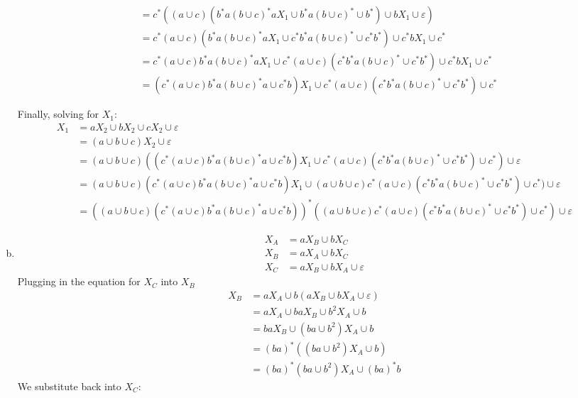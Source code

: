 \begin{solution}
\begin{enumerate}[(a)]
\begin{align*}
            &= c^*((a\cup c)(b^*a{(b\cup c)}^*aX_1\cup b^*a{(b\cup c)}^*\cup b^*)\cup bX_1\cup\varepsilon)\\
            &= c^*(a\cup c)(b^*a{(b\cup c)}^*aX_1\cup c^*b^*a{(b\cup c)}^*\cup c^*b^*)\cup c^*bX_1\cup c^*\\
            &= c^*(a\cup c)b^*a{(b\cup c)}^*aX_1\cup c^*(a\cup c)(c^*b^*a{(b\cup c)}^*\cup c^*b^*)\cup c^*bX_1\cup c^*\\
            &= (c^*(a\cup c)b^*a{(b\cup c)}^*a\cup c^*b)X_1\cup c^*(a\cup c)(c^*b^*a{(b\cup c)}^*\cup c^*b^*)\cup c^*
    \end{align*}

    Finally, solving for \(X_1\):
    \begin{align*}
        X_1 &= aX_2\cup bX_2\cup cX_2\cup\varepsilon \\
            &= (a\cup b\cup c)X_2\cup\varepsilon \\
            &= (a\cup b\cup c)((c^*(a\cup c)b^*a{(b\cup c)}^*a\cup c^*b)X_1\cup c^*(a\cup c)(c^*b^*a{(b\cup c)}^*\cup c^*b^*)\cup c^*)\cup\varepsilon \\
            &= (a\cup b\cup c)(c^*(a\cup c)b^*a{(b\cup c)}^*a\cup c^*b)X_1\cup (a\cup b\cup c)c^*(a\cup c)(c^*b^*a{(b\cup c)}^*\cup c^*b^*)\cup c^*)\cup\varepsilon \\
            &= {\left((a\cup b\cup c)(c^*(a\cup c)b^*a{(b\cup c)}^*a\cup c^*b)\right)}^*((a\cup b\cup c)c^*(a\cup c)(c^*b^*a{(b\cup c)}^*\cup c^*b^*)\cup c^*)\cup\varepsilon
    \end{align*}
        \item
    \begin{align*}
        X_A &= aX_B\cup bX_C\\
        X_B &= aX_A\cup bX_C\\
        X_C &= aX_B\cup bX_A\cup\varepsilon
    \end{align*}
    Plugging in the equation for \(X_C\) into \(X_B\)
    \begin{align*}
        X_B &= aX_A\cup b(aX_B\cup bX_A\cup\varepsilon)\\
            &= aX_A\cup baX_B\cup b^2X_A\cup b\\
            &= baX_B\cup (ba\cup b^2)X_A\cup b\\
            &= {(ba)}^*((ba\cup b^2)X_A\cup b)\\
            &= {(ba)}^*(ba\cup b^2)X_A\cup {(ba)}^*b
    \end{align*}
    We substitute back into \(X_C\):
    \begin{align*}

\end{align*}
\end{enumerate}
\end{solution}
